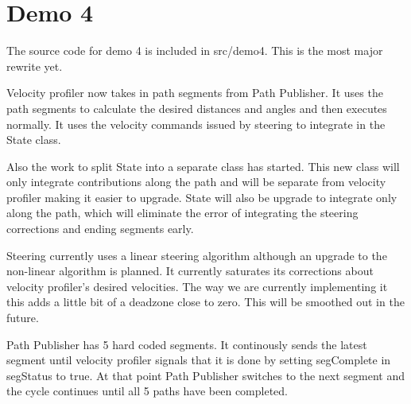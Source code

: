 \section{Demo 4}
The source code for demo 4 is included in src/demo4.  This is the most
major rewrite yet.

Velocity profiler now takes in path segments from Path Publisher.  It
uses the path segments to calculate the desired distances and angles
and then executes normally. It uses the velocity commands issued by
steering to integrate in the State class.

Also the work to split State into a separate class has started.  This
new class will only integrate contributions along the path and will be
separate from velocity profiler making it easier to upgrade.  State
will also be upgrade to integrate only along the path, which will
eliminate the error of integrating the steering corrections and ending
segments early.

Steering currently uses a linear steering algorithm although an
upgrade to the non-linear algorithm is planned.  It currently
saturates its corrections about velocity profiler's desired
velocities.  The way we are currently implementing it this adds a
little bit of a deadzone close to zero.  This will be smoothed out in
the future.

Path Publisher has 5 hard coded segments.  It continously sends the
latest segment until velocity profiler signals that it is done by
setting segComplete in segStatus to true.  At that point Path
Publisher switches to the next segment and the cycle continues until
all 5 paths have been completed.